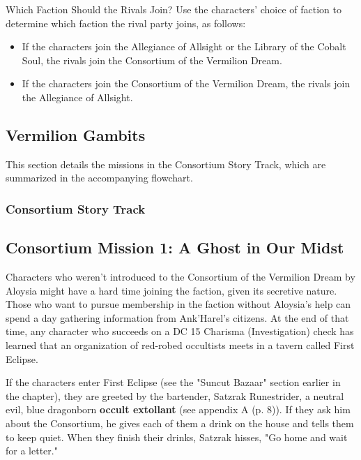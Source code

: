 \documentclass[a4paper, 11pt, bg=full, twocolumn, nooutline]{dndbook}
\begin{document}
\begin{DndSidebar}{Which Faction Should the Rivals Join?}
Use the characters' choice of faction to determine which faction the rival party joins, as follows:
\begin{itemize}
\item If the characters join the Allegiance of Allsight or the Library of the Cobalt Soul, the rivals join the Consortium of the Vermilion Dream.
\item If the characters join the Consortium of the Vermilion Dream, the rivals join the Allegiance of Allsight.
\end{itemize}
\end{DndSidebar}

\subsection{Vermilion Gambits}

This section details the missions in the Consortium Story Track, which are summarized in the accompanying flowchart.

\subsubsection{Consortium Story Track}



\subsection{Consortium Mission 1: A Ghost in Our Midst}

Characters who weren't introduced to the Consortium of the Vermilion Dream by Aloysia might have a hard time joining the faction, given its secretive nature. Those who want to pursue membership in the faction without Aloysia's help can spend a day gathering information from Ank'Harel's citizens. At the end of that time, any character who succeeds on a DC 15 Charisma (Investigation) check has learned that an organization of red-robed occultists meets in a tavern called First Eclipse.

If the characters enter First Eclipse (see the "Suncut Bazaar" section earlier in the chapter), they are greeted by the bartender, Satzrak Runestrider, a neutral evil, blue dragonborn \textbf{occult extollant} (see appendix A (p. 8)). If they ask him about the Consortium, he gives each of them a drink on the house and tells them to keep quiet. When they finish their drinks, Satzrak hisses, "Go home and wait for a letter."
\end{document}
